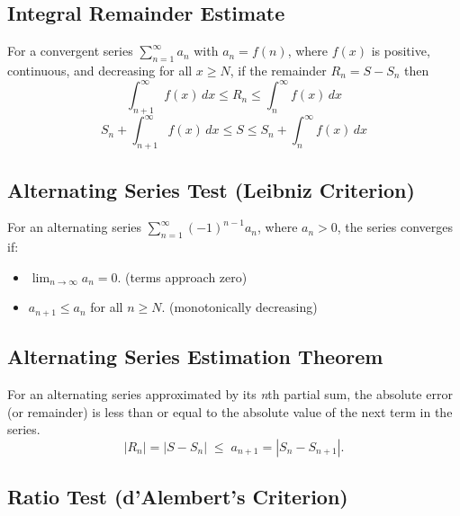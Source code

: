 \documentclass[a4paper,11pt]{article}
\theoremstyle{definition}
\theoremstyle{plain}
\theoremstyle{remark}
\begin{document}


\subsection{Integral Remainder Estimate}

\begin{tcolorbox}
    For a convergent series $\textstyle \sum_{n=1}^{\infty} a_n$ with $a_n = f(n)$, where $f(x)$ is positive, continuous, and decreasing for all $x \geq N$, if the remainder $R_n = S - S_n$ then
    \[
    \int_{n+1}^{\infty} f(x) \, dx \leq R_n \leq \int_n^{\infty} f(x) \, dx
    \]
    \[
    S_n + \int_{n+1}^{\infty} f(x) \, dx  \leq S \leq S_n + \int_n^{\infty} f(x) \, dx
    \]
\end{tcolorbox}




\subsection{Alternating Series Test (Leibniz Criterion)}

\begin{tcolorbox}
    For an alternating series $\sum_{n=1}^{\infty} (-1)^{n-1} a_n$, where $a_n > 0$, the series converges if:
    \begin{itemize}
        \item $\lim_{n \to \infty} a_n = 0$. (terms approach zero)
        \item $a_{n+1} \leq a_n$ for all $n \geq N$. (monotonically decreasing)
    \end{itemize}
\end{tcolorbox}




\subsection{Alternating Series Estimation Theorem}

\begin{tcolorbox}
    For an alternating series approximated by its \emph{n}th partial sum, the absolute error (or remainder) is less than or equal to the absolute value of the next term in the series.
    \[
    |R_n| = |S - S_n| \; \leq \; a_{n+1} = |S_n - S_{n+1}|.
    \]
\end{tcolorbox}




\subsection{Ratio Test (d'Alembert's Criterion)}
\end{document}
